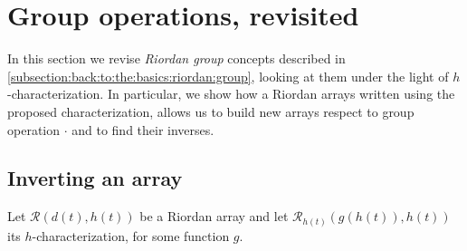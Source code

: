 

\section{Group operations, revisited}

In this section we revise \emph{Riordan group} concepts described in
\autoref{subsection:back:to:the:basics:riordan:group}, looking at them under
the light of $h$-characterization. In particular, we show how a Riordan arrays
written using the proposed characterization, allows us to build new arrays
respect to group operation $\cdot$ and to find their inverses.

\subsection{Inverting an array}

Let $\mathcal{R}\left(d(t),h(t)\right)$ be a Riordan array and let 
$\mathcal{R}_{h(t)}\left(g(h(t)),h(t)\right)$ its $h$-characterization, for some
function $g$. %
 
